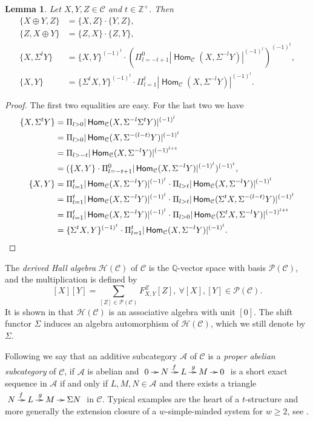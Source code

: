 \documentclass[reqno,12pt,a4paper]{amsart}
\newtheorem{lemma}[theorem]{Lemma}
\theoremstyle{remark}
\theoremstyle{definition}
\newcommand{\opname}[1]{\operatorname{\mathsf{#1}}}
\newcommand{\Hom}{\opname{Hom}}
\newcommand{\ca}{{\mathcal A}}
\newcommand{\cc}{{\mathcal C}}
\newcommand{\ch}{{\mathcal H}}
\newcommand{\cp}{{\mathcal P}}
\numberwithin{equation}{section}
\begin{document}
\begin{lemma}
\label{lemma-derived-Hall-number-for-direct-sum}
Let $X,Y,Z\in \mathcal{C}$ and $t\in\mathbb{Z}^+$. Then
\begin{align*}
\{X\oplus Y,Z\}&=\{X,Z\}\cdot \{Y,Z\},\\
\{Z,X\oplus Y\}&=\{Z,X\}\cdot \{Z,Y\},\\
\{X,\Sigma^t Y\}&=\{X,Y\}^{(-1)^t}\cdot(\Pi_{l=-t+1}^0|\Hom_\cc(X,\Sigma^{-l}Y)|^{(-1)^l})^{(-1)^t},\\
\{X,Y\}&=\{\Sigma^t X,Y\}^{(-1)^t}\cdot \Pi_{l=1}^{t}|\Hom_\cc(X,\Sigma^{-l}Y)|^{(-1)^l}.
\end{align*}
\end{lemma}
\begin{proof}
The first two equalities are easy. For the last two we have
\begin{align*}
\{X,\Sigma^t Y\}&=\Pi_{l>0}|\Hom_\cc(X,\Sigma^{-l}\Sigma^t Y)|^{(-1)^l}\\
&=\Pi_{l>0}|\Hom_\cc(X,\Sigma^{-(l-t)}Y)|^{(-1)^l}\\
&=\Pi_{l>-t}|\Hom_\cc(X,\Sigma^{-l}Y)|^{(-1)^{l+t}}\\
&=(\{X,Y\}\cdot\Pi_{l=-t+1}^0|\Hom_\cc(X,\Sigma^{-l}Y)|^{(-1)^l})^{(-1)^t},\\
\{X,Y\}&=\Pi_{l=1}^t|\Hom_\cc(X,\Sigma^{-l}Y)|^{(-1)^l}\cdot\Pi_{l>t}|\Hom_\cc(X,\Sigma^{-l}Y)|^{(-1)^l}\\
&=\Pi_{l=1}^t|\Hom_\cc(X,\Sigma^{-l}Y)|^{(-1)^l}\cdot\Pi_{l>t}|\Hom_\cc(\Sigma^t X,\Sigma^{-(l-t)}Y)|^{(-1)^l}\\
&=\Pi_{l=1}^t|\Hom_\cc(X,\Sigma^{-l}Y)|^{(-1)^l}\cdot\Pi_{l>0}|\Hom_\cc(\Sigma^t X,\Sigma^{-l}Y)|^{(-1)^{l+t}}\\
&=\{\Sigma^t X,Y\}^{(-1)^t}\cdot \Pi_{l=1}^{t}|\Hom_\cc(X,\Sigma^{-l}Y)|^{(-1)^l}.\qedhere
\end{align*}
\end{proof}

The \emph{derived Hall algebra} $\mathcal{H(C)}$ of $\mathcal{C}$ is the $\mathbb{Q}$-vector space with basis $\mathcal{P(C)}$, and the multiplication is defined by
\[[X][Y]=\sum_{[Z]\in\cp(\cc)}F_{X,Y}^Z [Z],~ \forall [X], [Y]\in \mathcal{P(C)}.\]
It is shown in \cite{Toen06,XiaoXu06} that $\mathcal{H(C)}$ is an associative algebra with unit $[0]$. The shift functor $\Sigma$ induces an algebra automorphism of $\ch(\cc)$, which we still denote by $\Sigma$.

\medskip
Following \cite[Definition 2.2]{Jorgensen22} we say that an additive subcategory $\ca$ of $\cc$ is a \emph{proper abelian subcategory} of $\cc$, if $\ca$ is abelian and $\xymatrix@C=0.7pc{0\ar[r] & N\ar[r]^f & L\ar[r]^g & M\ar[r] & 0}$ is a short exact sequence in $\ca$ if and only if $L, M,N\in\ca$ and there exists a triangle $\xymatrix@C=0.7pc{N\ar[r]^f & L\ar[r]^g & M\ar[r] & \Sigma N}$ in $\cc$. Typical examples are the heart of a $t$-structure and more generally the extension closure of a $w$-simple-minded system for $w\geq 2$, see \cite{Jorgensen22}.
\end{document}
